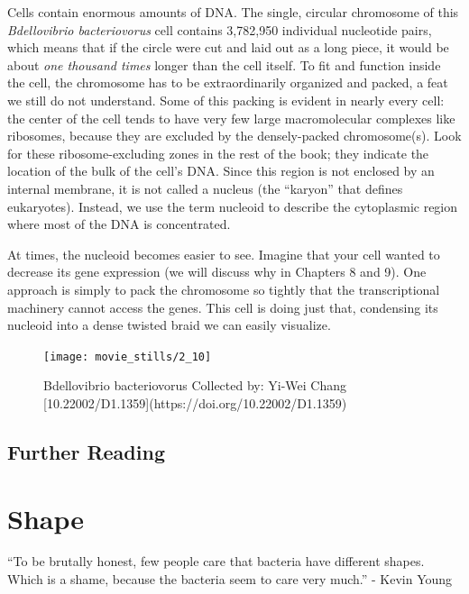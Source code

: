 \documentclass[]{tufte-book}
\begin{document}
Cells contain enormous amounts of DNA. The single, circular chromosome
of this \emph{Bdellovibrio bacteriovorus} cell contains 3,782,950
individual nucleotide pairs, which means that if the circle were cut and
laid out as a long piece, it would be about \emph{one thousand times}
longer than the cell itself. To fit and function inside the cell, the
chromosome has to be extraordinarily organized and packed, a feat we
still do not understand. Some of this packing is evident in nearly every
cell: the center of the cell tends to have very few large macromolecular
complexes like ribosomes, because they are excluded by the
densely-packed chromosome(s). Look for these ribosome-excluding zones in
the rest of the book; they indicate the location of the bulk of the
cell's DNA. Since this region is not enclosed by an internal membrane,
it is not called a nucleus (the ``karyon'' that defines eukaryotes).
Instead, we use the term nucleoid to describe the cytoplasmic region
where most of the DNA is concentrated.

At times, the nucleoid becomes easier to see. Imagine that your cell
wanted to decrease its gene expression (we will discuss why in Chapters
8 and 9). One approach is simply to pack the chromosome so tightly that
the transcriptional machinery cannot access the genes. This cell is
doing just that, condensing its nucleoid into a dense twisted braid we
can easily visualize.

\begin{figure}
\texttt{[image: movie\_stills/2\_10]} \caption[Bdellovibrio bacteriovorus Collected by]{Bdellovibrio bacteriovorus Collected by: Yi-Wei Chang [10.22002/D1.1359](https://doi.org/10.22002/D1.1359)}\label{fig:unnamed-chunk-44}
\end{figure}

\section{Further Reading}\label{further-reading-1}

\citet{errington2013} \citet{ptacin2013} \citet{sleytr1999}
\citet{strahl2017}

\chapter{Shape}\label{shape}

``To be brutally honest, few people care that bacteria have different
shapes. Which is a shame, because the bacteria seem to care very much.''
- Kevin Young \citet{young2006}
\end{document}
